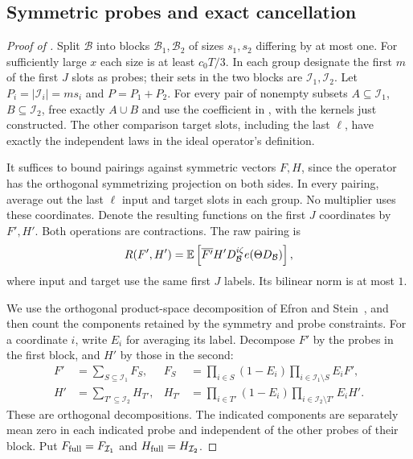 \subsection{Symmetric probes and exact cancellation}

\begin{proof}[Proof of ]
Split $\mathcal B$ into blocks $\mathcal B_1,\mathcal B_2$ of
sizes $s_1,s_2$ differing by at most one.  For sufficiently
large $x$ each size is at least $c_0T/3$.  In each group
designate the first $m$ of the first $J$ slots as probes; their
sets in the two blocks are $\mathcal I_1,\mathcal I_2$.
Let $P_i=|\mathcal I_i|=ms_i$ and $P=P_1+P_2$.
For every pair of nonempty subsets
$A\subseteq\mathcal I_1$, $B\subseteq\mathcal I_2$, free
exactly $A\cup B$ and use the coefficient in
, with the kernels just
constructed.  The other comparison target slots, including
the last $\ell$, have exactly the independent laws in the
ideal operator's definition.

It suffices to bound pairings against symmetric vectors $F,H$,
since the operator has the orthogonal symmetrizing projection
on both sides.  In every pairing, average out the last $\ell$
input and target slots in each group.  No multiplier uses
these coordinates.  Denote the resulting functions on the
first $J$ coordinates by $F',H'$.  Both operations are
contractions.  The raw pairing is
\begin{equation}\label{eq:ideal-raw-pairing}
 R(F',H')=
 \mathbb E\left[\overline{F'}H'
       D_{\mathcal B}^{i\zeta}e\!\left(\Theta D_{\mathcal B}\right)\right],
\end{equation}
where input and target use the same first $J$ labels.  Its
bilinear norm is at most $1$.

We use the orthogonal product-space decomposition of
Efron and Stein~\cite[Section~2, Decomposition Lemma]{EfronStein1981},
and then count the components retained by the symmetry and probe
constraints. For a coordinate $i$, write $E_i$ for averaging its label.
Decompose $F'$ by the probes in the first block, and $H'$ by
those in the second:
\begin{align*}
 F'&=\sum_{S\subseteq\mathcal I_1}F_S,
 &F_S&=\prod_{i\in S}(1-E_i)
          \prod_{i\in\mathcal I_1\setminus S}E_iF',\\
 H'&=\sum_{T'\subseteq\mathcal I_2}H_{T'},
 &H_{T'}&=\prod_{i\in T'}(1-E_i)
          \prod_{i\in\mathcal I_2\setminus T'}E_iH'.
\end{align*}
These are orthogonal decompositions.  The indicated components
are separately mean zero in each indicated probe and
independent of the other probes of their block.  Put
$F_{\rm full}=F_{\mathcal I_1}$ and
$H_{\rm full}=H_{\mathcal I_2}$.


\end{proof}
